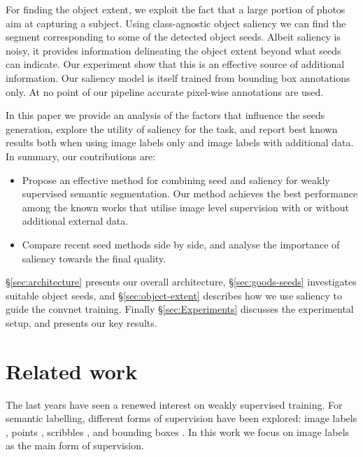 \documentclass[british,10pt,twocolumn,letterpaper]{article}
\begin{document}
For finding the object extent, we exploit the fact that a large portion
of photos aim at capturing a subject. Using class-agnostic object
saliency we can find the segment corresponding to some of the detected
object seeds. Albeit saliency is noisy, it provides information delineating
the object extent beyond what seeds can indicate. Our experiment show
that this is an effective source of additional information. Our saliency
model is itself trained from bounding box annotations only. At no
point of our pipeline accurate pixel-wise annotations are used.

In this paper we provide an analysis of the factors that influence
the seeds generation, explore the utility of saliency for the task,
and report best known results both when using image labels only and
image labels with additional data. In summary, our contributions are: 

\begin{itemize}
\item Propose an effective method for combining seed and saliency for weakly supervised semantic segmentation. Our method achieves the best performance among
the known works that utilise image level supervision with or without
additional external data.
\item Compare recent seed methods side by side, and analyse the
    importance of saliency towards the final quality.
\end{itemize}

\S \ref{sec:architecture} presents our overall architecture,
\S \ref{sec:goods-seeds} investigates suitable object seeds,
and \S \ref{sec:object-extent} describes how we use saliency
to guide the convnet training. Finally \S \ref{sec:Experiments}
discusses the experimental setup, and presents our key results.

\section{\label{sec:Related-work}Related work}

\noindent
The last years have seen a renewed interest on weakly supervised training.
For semantic labelling, different forms of supervision have been explored:
image labels \cite{Pathak2015Iclrw,Pathak2015Iccv,Papandreou2015Iccv,Pinheiro2015Cvpr,Wei2015ArXiv,kolesnikov2016seed},
points \cite{Bearman2015ArXiv}, scribbles \cite{Xu2015CvprWeakSegmentation,Lin2016CvprScribbleSup},
and bounding boxes \cite{Dai2015Iccv,Papandreou2015Iccv,Khoreva2016Arxiv}.
In this work we focus on image labels as the main form of supervision.
\end{document}
